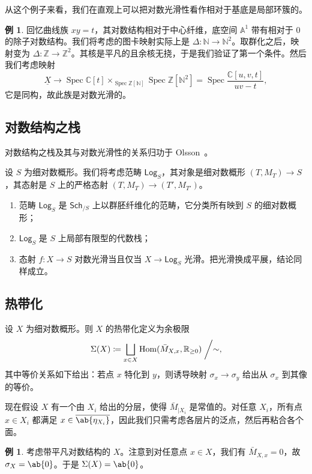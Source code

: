 \documentclass{amsart}
\theoremstyle{definition}
\newtheorem{exm}[thm]{例}
\theoremstyle{remark}
\theoremstyle{plain}
\theoremstyle{definition}
\theoremstyle{remark}
\newcommand{\A}{\mathbb{A}}
\newcommand{\N}{\mathbb{N}}
\newcommand{\R}{\mathbb{R}}
\newcommand{\C}{\mathbb{C}}
\newcommand{\Z}{\mathbb{Z}}
\newcommand{\ms}[1]{\mathsf{#1}}
\newcommand{\ol}[1]{\overline{#1}}
\newcommand{\ul}[1]{\underline{#1}}
\newcommand{\1}{\mathbf{1}}
\newcommand{\2}{\mathbf{2}}
\newcommand{\3}{\mathbf{3}}
\DeclareMathOperator{\Hom}{Hom}
\DeclareMathOperator{\Spec}{Spec}
\begin{document}
从这个例子来看，我们在直观上可以把对数光滑性看作相对于基底是局部环簇的。

\begin{exm}
    回忆曲线族 \(xy = t\)，其对数结构相对于中心纤维，底空间 \(\A^1\) 带有相对于 \(0\) 的除子对数结构。我们将考虑的图卡映射实际上是 \(\Delta \colon \N \to \N^2\)。取群化之后，映射变为 \(\Delta \colon \Z \to \Z^2\)。其核是平凡的且余核无挠，于是我们验证了第一个条件。然后我们考虑映射
    \[ \ul{X} \to \Spec \C[t] \times_{\Spec \Z[\N]} \Spec \Z[\N^2] = \Spec \frac{\C[u,v,t]}{uv-t}, \]
    它是同构，故此族是对数光滑的。
\end{exm}

\subsection{对数结构之栈}%
\label{sub:Stack of log structures}

对数结构之栈及其与对数光滑性的关系归功于 Olsson~\cite{Olsson2003}。

设 \(S\) 为细对数概形。我们将考虑范畴 \(\ms{Log}_S\)，其对象是细对数概形 \((T, M_T) \to S\)，其态射是 \(S\) 上的严格态射 \((T, M_T) \to (T', M_{T'})\)。
\begin{enumerate}
    \item 范畴 \(\ms{Log}_S\) 是 \(\ms{Sch}_{/S}\) 上以群胚纤维化的范畴，它分类所有映到 \(S\) 的细对数概形；
    \item \(\ms{Log}_S\) 是 \(S\) 上局部有限型的代数栈；
    \item 态射 \(f \colon X \to S\) 对数光滑当且仅当 \(X \to \ms{Log}_S\) 光滑。把光滑换成平展，结论同样成立。
\end{enumerate}

\subsection{热带化}%
\label{sub:Tropicalization}

设 \(X\) 为细对数概形。则 \(X\) 的热带化定义为余极限
\[\Sigma(X) \coloneqq \bigsqcup_{x \in X} \Hom(\bar{M}_{X,x}, \R_{\geq 0}) \biggm/ \sim, \]
其中等价关系如下给出：若点 \(x\) 特化到 \(y\)，则诱导映射 \(\sigma_x \to \sigma_y\) 给出从 \(\sigma_x\) 到其像的等价。

现在假设 \(X\) 有一个由 \(X_i\) 给出的分层，使得 \(\bar{M}_{|X_i}\) 是常值的。对任意 \(X_i\)，所有点 \(x \in X_i\) 都满足 \(x \in \ol{\ab\{\eta_{X_i}\}}\)，因此我们只需考虑各层片的泛点，然后再粘合各个面。

\begin{exm}
    考虑带平凡对数结构的 \(X\)。注意到对任意点 \(x \in X\)，我们有 \(\bar{M}_{X,x} = 0\)，故 \(\sigma_X = \ab\{0\}\)。于是 \(\Sigma(X) = \ab\{0\}\)。
\end{exm}
\end{document}
